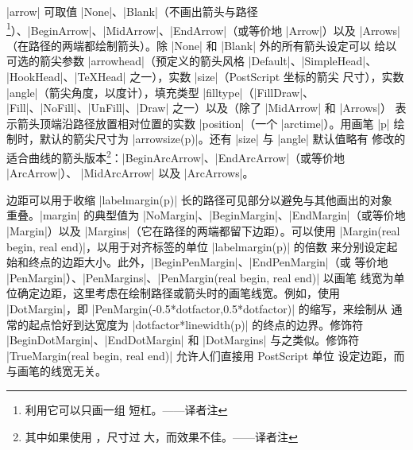 \documentclass[nofonts,CJKnormalspaces]{ctexbook}[2009/05/20]
\newcommand*\prgname[1]{\textsf{#1}}
\newcommand\transnote[1]{\footnote{#1——译者注}}
\begin{document}
|arrow| 可取值 |None|、|Blank|（不画出箭头与路径\transnote{利用它可以只画一组
短杠。}）、|BeginArrow|、|MidArrow|、|EndArrow|（或等价地 |Arrow|）以及
|Arrows|（在路径的两端都绘制箭头）。除 |None| 和 |Blank| 外的所有箭头设定可以
给以可选的箭尖参数 |arrowhead|（预定义的箭头风格 |Default|、|SimpleHead|、
|HookHead|、|TeXHead| 之一），实数 |size|（\prgname{PostScript} 坐标的箭尖
尺寸），实数 |angle|（箭尖角度，以度计），填充类型 |filltype|（|FillDraw|、
|Fill|、|NoFill|、|UnFill|、|Draw| 之一）以及（除了 |MidArrow| 和 |Arrows|）
表示箭头顶端沿路径放置相对位置的实数 |position|（一个 |arctime|）。用画笔 |p|
绘制时，默认的箭尖尺寸为 |arrowsize(p)|。还有 |size| 与 |angle| 默认值略有
修改的适合曲线的箭头版本\transnote{其中如果使用 ，尺寸过
大，而效果不佳。}：|BeginArcArrow|、|EndArcArrow|（或等价地 |ArcArrow|）、
|MidArcArrow| 以及 |ArcArrows|。

边距可以用于收缩 |labelmargin(p)| 长的路径可见部分以避免与其他画出的对象
重叠。|margin| 的典型值为 |NoMargin|、|BeginMargin|、|EndMargin|（或等价地
|Margin|）以及 |Margins|（它在路径的两端都留下边距）。可以使用
|Margin(real begin, real end)|，以用于对齐标签的单位 |labelmargin(p)| 的倍数
来分别设定起始和终点的边距大小。此外，|BeginPenMargin|、|EndPenMargin|（或
等价地 |PenMargin|）、|PenMargins|、|PenMargin(real begin, real end)| 以画笔
线宽为单位确定边距，这里考虑在绘制路径或箭头时的画笔线宽。例如，使用
|DotMargin|，即 |PenMargin(-0.5*dotfactor,0.5*dotfactor)| 的缩写，来绘制从
通常的起点恰好到达宽度为 |dotfactor*linewidth(p)| 的终点的边界。修饰符
|BeginDotMargin|、|EndDotMargin| 和 |DotMargins| 与之类似。修饰符
|TrueMargin(real begin, real end)| 允许人们直接用 \prgname{PostScript} 单位
设定边距，而与画笔的线宽无关。
\end{document}
